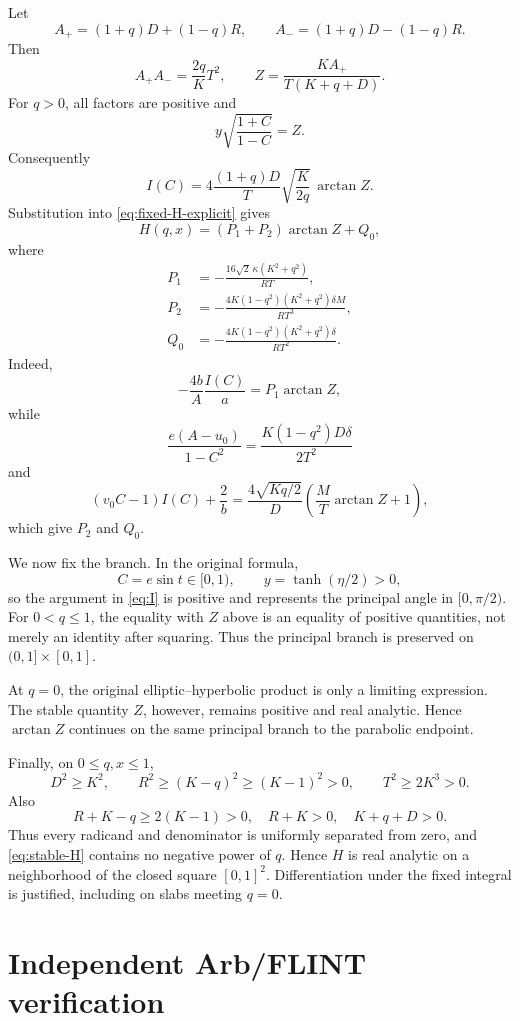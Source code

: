 \documentclass[11pt]{article}
\numberwithin{equation}{section}
\theoremstyle{remark}
\begin{document}
Let
\[
  A_+=(1+q)D+(1-q)R,
  \qquad
  A_-=(1+q)D-(1-q)R.
\]
Then
\[
  A_+A_-=\frac{2q}{K}T^2,
  \qquad
  Z=\frac{KA_+}{T(K+q+D)}.
\]
For \(q>0\), all factors are positive and
\[
  y\sqrt{\frac{1+C}{1-C}}=Z.
\]
Consequently
\[
  I(C)=4\frac{(1+q)D}{T}\sqrt{\frac K{2q}}\,\arctan Z.
\]
Substitution into \eqref{eq:fixed-H-explicit} gives
\begin{equation}
  H(q,x)=(P_1+P_2)\arctan Z+Q_0,
  \label{eq:stable-H}
\end{equation}
where
\begin{align*}
  P_1&=-\frac{16\sqrt2\,\kappa(K^2+q^2)}{RT},\\
  P_2&=-\frac{4K(1-q^2)(K^2+q^2)\delta M}{RT^3},\\
  Q_0&=-\frac{4K(1-q^2)(K^2+q^2)\delta}{RT^2}.
\end{align*}
Indeed,
\[
  -\frac{4b}{A}\frac{I(C)}a=P_1\arctan Z,
\]
while
\[
  \frac{e(A-u_0)}{1-C^2}=\frac{K(1-q^2)D\delta}{2T^2}
\]
and
\[
  (v_0C-1)I(C)+\frac2b
  =\frac{4\sqrt{Kq/2}}D\left(\frac MT\arctan Z+1\right),
\]
which give \(P_2\) and \(Q_0\).

We now fix the branch.  In the original formula,
\[
  C=e\sin t\in[0,1),
  \qquad y=\tanh(\eta/2)>0,
\]
so the argument in \eqref{eq:I} is positive and represents the principal angle in \([0,\pi/2)\).  For \(0<q\le1\), the equality with \(Z\) above is an equality of positive quantities, not merely an identity after squaring.  Thus the principal branch is preserved on \((0,1]\times[0,1]\).

At \(q=0\), the original elliptic--hyperbolic product is only a limiting expression.  The stable quantity \(Z\), however, remains positive and real analytic.  Hence \(\arctan Z\) continues on the same principal branch to the parabolic endpoint.

Finally, on \(0\le q,x\le1\),
\[
  D^2\ge K^2,
  \qquad
  R^2\ge(K-q)^2\ge(K-1)^2>0,
  \qquad
  T^2\ge2K^3>0.
\]
Also
\[
  R+K-q\ge2(K-1)>0,
  \quad R+K>0,
  \quad K+q+D>0.
\]
Thus every radicand and denominator is uniformly separated from zero, and \eqref{eq:stable-H} contains no negative power of \(q\).  Hence \(H\) is real analytic on a neighborhood of the closed square \([0,1]^2\).  Differentiation under the fixed integral is justified, including on slabs meeting \(q=0\).

\section{Independent Arb/FLINT verification}
\label{app:arb}
\end{document}
